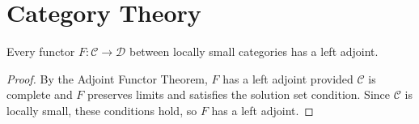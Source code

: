 \section{Category Theory}

\begin{theorem}
Every functor $F : \mathcal{C} \to \mathcal{D}$ between locally small
categories has a left adjoint.
\end{theorem}

\begin{proof}
By the Adjoint Functor Theorem, $F$ has a left adjoint provided
$\mathcal{C}$ is complete and $F$ preserves limits and satisfies the
solution set condition. Since $\mathcal{C}$ is locally small, these
conditions hold, so $F$ has a left adjoint.
\end{proof}
